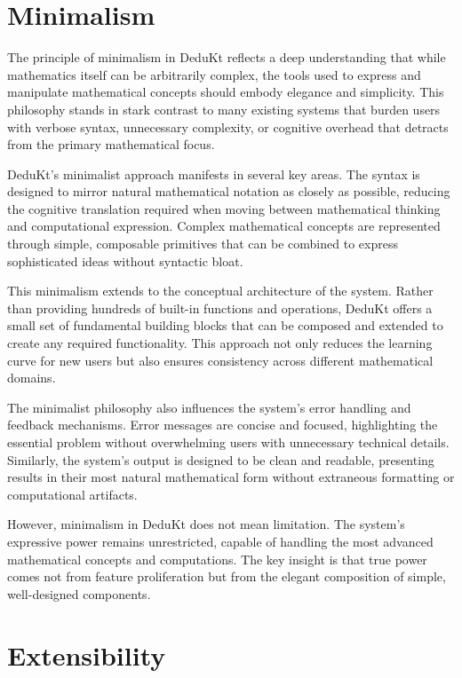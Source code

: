 \section{Minimalism}\label{sec:minimalism}

The principle of minimalism in DeduKt reflects a deep understanding that while mathematics itself can be arbitrarily complex, the tools used to express and manipulate mathematical concepts should embody elegance and simplicity.
This philosophy stands in stark contrast to many existing systems that burden users with verbose syntax, unnecessary complexity, or cognitive overhead that detracts from the primary mathematical focus.

DeduKt's minimalist approach manifests in several key areas.
The syntax is designed to mirror natural mathematical notation as closely as possible, reducing the cognitive translation required when moving between mathematical thinking and computational expression.
Complex mathematical concepts are represented through simple, composable primitives that can be combined to express sophisticated ideas without syntactic bloat.

This minimalism extends to the conceptual architecture of the system.
Rather than providing hundreds of built-in functions and operations, DeduKt offers a small set of fundamental building blocks that can be composed and extended to create any required functionality.
This approach not only reduces the learning curve for new users but also ensures consistency across different mathematical domains.

The minimalist philosophy also influences the system's error handling and feedback mechanisms.
Error messages are concise and focused, highlighting the essential problem without overwhelming users with unnecessary technical details.
Similarly, the system's output is designed to be clean and readable, presenting results in their most natural mathematical form without extraneous formatting or computational artifacts.

However, minimalism in DeduKt does not mean limitation.
The system's expressive power remains unrestricted, capable of handling the most advanced mathematical concepts and computations.
The key insight is that true power comes not from feature proliferation but from the elegant composition of simple, well-designed components.

\section{Extensibility}\label{sec:extensibility}

